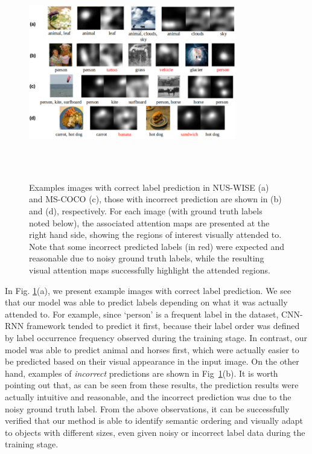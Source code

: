 \documentclass[letterpaper]{article} %
\begin{document}
\begin{figure}[t!]
\centering
\includegraphics[width=0.81\textwidth,height=3.68in ]{./Visualization.png}
\caption{Examples images with correct label prediction in NUS-WISE (a) and MS-COCO (c), those with incorrect prediction are shown in (b) and (d), respectively. For each image (with ground truth labels noted below), the associated attention maps are presented at the right hand side, showing the regions of interest visually attended to. Note that some incorrect predicted labels (in red) were expected and reasonable due to noisy ground truth labels, while the resulting visual attention maps successfully highlight the attended regions.}
\label{fig:visualization}
\end{figure}


In Fig. \ref{fig:visualization}(a), we present example images with correct label prediction. We see that our model was able to predict labels depending on what it was actually attended to. For example, since `person' is a frequent label in the dataset, CNN-RNN framework tended to predict it first, because their label order was defined by label occurrence frequency observed during the training stage. In contrast, our model was able to predict animal and horses first, which were actually easier to be predicted based on their visual appearance in the input image. On the other hand, examples of \emph{incorrect} predictions are shown in Fig~\ref{fig:visualization}(b). It is worth pointing out that, as can be seen from these results, the prediction results were actually intuitive and reasonable, and the incorrect prediction was due to the noisy ground truth label. From the above observations, it can be successfully verified that our method is able to identify semantic ordering and visually adapt to objects with different sizes, even given noisy or incorrect label data during the training stage.
\end{document}
